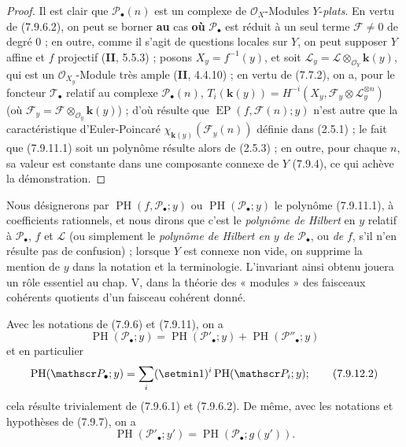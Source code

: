 \begin{proof}
Il est clair que $\mathscr P_\bullet(n)$ est un complexe de
$\mathscr O_X$-Modules $Y$-\emph{plats}. En vertu de (7.9.6.2), on peut se borner \textbf{au} cas
\textbf{où} $\mathscr P_\bullet$ est réduit à un seul terme $\mathscr F\ne0$ de degré 0 ;
en outre, comme il s'agit de questions locales sur $Y$, on peut supposer $Y$
affine et $f$ projectif (\textbf{II}, 5.5.3) ; posons $X_y=f^{-1}(y)$, et soit
$\mathscr L_y=\mathscr L\otimes_{\mathscr O_Y}\boldsymbol{k}(y)$, qui est un
$\mathscr O_{X_y}$-Module très ample (\textbf{II}, 4.4.10) ; en vertu de (7.7.2), on a,
pour le foncteur $\mathscr T_\bullet$ relatif au complexe
$\mathscr P_\bullet(n)$, $T_i(\boldsymbol{k}(y))=H^{-i}(X_y,\mathscr F_y\otimes\mathscr L_y^{\otimes n})$
(où $\mathscr F_y=\mathscr F\otimes_{\mathscr O_y}\boldsymbol{k}(y)$) ;
d'où résulte que $\operatorname{EP}(f,\mathscr F(n);y)$ n'est autre que la
caractéristique d'Euler-Poincaré $\chi_{\mathbf{k}(y)}(\mathscr F_y(n))$ définie dans
(2.5.1) ; le fait que (7.9.11.1) soit un polynôme résulte alors de (2.5.3) ; en
outre, pour chaque $n$, sa valeur est constante dans une composante connexe de
$Y$ (7.9.4), ce qui achève la démonstration.
\end{proof}

Nous désignerons par $\operatorname{PH}(f,\mathscr P_\bullet;y)$ ou
$\operatorname{PH}(\mathscr P_\bullet;y)$ le polynôme (7.9.11.1), à coefficients
rationnels, et nous dirons que c'est le \emph{polynôme de Hilbert} en $y$
relatif à $\mathscr P_\bullet$, $f$ et $\mathscr L$ (ou simplement le
\emph{polynôme de Hilbert en $y$ de $\mathscr P_\bullet$}, ou \emph{de} $f$, s'il n'en
résulte pas de confusion) ; lorsque $Y$ est connexe non vide, on supprime la
mention de $y$ dans la notation et la terminologie. L'invariant ainsi obtenu
jouera un rôle essentiel au chap. V, dans la théorie des « modules » des
faisceaux cohérents quotients d'un faisceau cohérent donné.

\begin{env}[7.9.12]
\label{III.7.9.12.fr}
Avec les notations de (7.9.6) et (7.9.11), on a
\[
  \operatorname{PH}(\mathscr P_\bullet;y)
  =\operatorname{PH}(\mathscr P'_\bullet;y)
  +\operatorname{PH}(\mathscr P''_\bullet;y)
  \tag{7.9.12.1}\label{III.7.9.12.1.fr}
\]
et en particulier
\[
  \operatorname{PH}(\mathscr P_\bullet;y)
  =\sum_i(\setmin 1)^i\operatorname{PH}(\mathscr P_i;y) ;
  \tag{7.9.12.2}\label{III.7.9.12.2.fr}
\]
cela résulte trivialement de (7.9.6.1) et (7.9.6.2). De même, avec les notations
et hypothèses de (7.9.7), on a
\[
  \operatorname{PH}(\mathscr P'_\bullet;y')
  =\operatorname{PH}(\mathscr P_\bullet;g(y')).
  \tag{7.9.12.3}\label{III.7.9.12.3.fr}
\]
\end{env}

